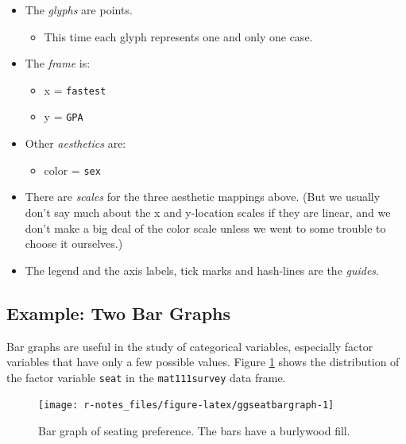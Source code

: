 \documentclass[]{book}
\providecommand{\tightlist}{%
  \setlength{\itemsep}{0pt}\setlength{\parskip}{0pt}}
\theoremstyle{definition}
\theoremstyle{definition}
\theoremstyle{definition}
\theoremstyle{remark}
\begin{document}
{\begin{itemize}
\tightlist
\item
  The \emph{glyphs} are points.

  \begin{itemize}
  \tightlist
  \item
    This time each glyph represents one and only one case.
  \end{itemize}
\item
  The \emph{frame} is:

  \begin{itemize}
  \tightlist
  \item
    x = \texttt{fastest}
  \item
    y = \texttt{GPA}
  \end{itemize}
\item
  Other \emph{aesthetics} are:

  \begin{itemize}
  \tightlist
  \item
    color = \texttt{sex}
  \end{itemize}
\item
  There are \emph{scales} for the three aesthetic mappings above. (But
  we usually don't say much about the x and y-location scales if they
  are linear, and we don't make a big deal of the color scale unless we
  went to some trouble to choose it ourselves.)
\item
  The legend and the axis labels, tick marks and hash-lines are the
  \emph{guides}.
\end{itemize}

\subsection{Example: Two Bar Graphs}\label{example-two-bar-graphs}

Bar graphs are useful in the study of categorical variables, especially
factor variables that have only a few possible values. Figure
\ref{fig:ggseatbargraph} shows the distribution of the factor variable
\texttt{seat} in the \texttt{mat111survey} data frame.

\begin{figure}

{\centering \texttt{[image: r-notes\_files/figure-latex/ggseatbargraph-1]} 

}

\caption{Bar graph of seating preference.  The bars have a burlywood fill.}\label{fig:ggseatbargraph}
\end{figure}

}
\end{document}
